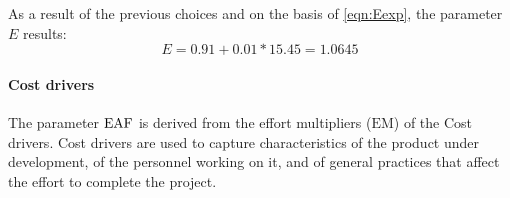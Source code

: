As a result of the previous choices and on the basis of \cref{eqn:Eexp}, the parameter $ E $ results:
\begin{equation}
	E = 0.91 + 0.01 * 15.45 = 1.0645
\end{equation}

















\paragraph{Cost drivers} The parameter $ \text{EAF} $ is derived from the effort multipliers ($ \text{EM} $) of the Cost drivers. Cost drivers are used to capture characteristics of the product under development, of the personnel working on it, and of general practices that affect the effort to complete the project.



